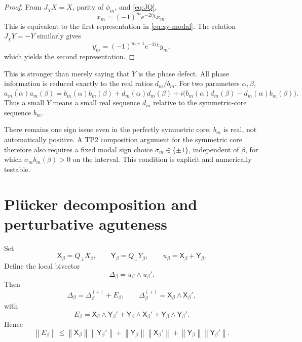 \documentclass[11pt]{amsart}
\numberwithin{equation}{section}
\theoremstyle{plain}
\theoremstyle{definition}
\theoremstyle{remark}
\newcommand{\norm}[1]{\left\lVert #1\right\rVert}
\begin{document}
\begin{proof}
From $J_\chi X=X$, parity of $\phi_m$, and \eqref{eq:JQ},
\begin{equation}
\overline{x_m}=(-1)^me^{-2i\chi}x_m.
\end{equation}
This is equivalent to the first representation in \eqref{eq:xy-modal}.  The relation $J_\chi Y=-Y$ similarly gives
\begin{equation}
\overline{y_m}=(-1)^{m+1}e^{-2i\chi}y_m,
\end{equation}
which yields the second representation.
\end{proof}

This is stronger than merely saying that $Y$ is the phase defect.  All phase information is reduced exactly to the real ratios $d_m/b_m$.  For two parameters $\alpha,\beta$,
\begin{equation}
\overline{a_m(\alpha)}a_m(\beta)
=b_m(\alpha)b_m(\beta)+d_m(\alpha)d_m(\beta)
+i\bigl(b_m(\alpha)d_m(\beta)-d_m(\alpha)b_m(\beta)\bigr).
\label{eq:mode-kernel-bd}
\end{equation}
Thus a small $Y$ means a small real sequence $d_m$ relative to the symmetric-core sequence $b_m$.

There remains one sign issue even in the perfectly symmetric core: $b_m$ is real, not automatically positive.  A TP2 composition argument for the symmetric core therefore also requires a fixed modal sign choice $\sigma_m\in\{\pm1\}$, independent of $\beta$, for which $\sigma_m b_m(\beta)>0$ on the interval.  This condition is explicit and numerically testable.

\section{Plücker decomposition and perturbative aguteness}
\label{sec:plucker}

Set
\begin{equation}
\mathsf X_\beta=Q_\perp X_\beta,
\qquad
\mathsf Y_\beta=Q_\perp Y_\beta,
\qquad
u_\beta=\mathsf X_\beta+\mathsf Y_\beta.
\end{equation}
Define the local bivector
\begin{equation}
\Delta_\beta=u_\beta\wedge u_\beta'.
\end{equation}
Then
\begin{equation}
\boxed{
\Delta_\beta=\Delta_\beta^{(+)}+E_\beta,
\qquad
\Delta_\beta^{(+)}=\mathsf X_\beta\wedge\mathsf X_\beta',
}
\label{eq:Delta-split}
\end{equation}
with
\begin{equation}
E_\beta
=\mathsf X_\beta\wedge\mathsf Y_\beta'
+\mathsf Y_\beta\wedge\mathsf X_\beta'
+\mathsf Y_\beta\wedge\mathsf Y_\beta'.
\end{equation}
Hence
\begin{equation}
\boxed{
\norm{E_\beta}
\le
\norm{\mathsf X_\beta}\norm{\mathsf Y_\beta'}
+\norm{\mathsf Y_\beta}\norm{\mathsf X_\beta'}
+\norm{\mathsf Y_\beta}\norm{\mathsf Y_\beta'}.
}
\label{eq:Ebound}
\end{equation}
\end{document}
